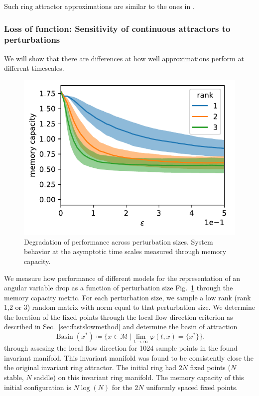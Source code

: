 \documentclass{article} %
\newcounter{ct}
\newcommand{\manifold}{\mathcal{M}}
\DeclareMathOperator{\basin}{Basin}
\theoremstyle{definition}
\theoremstyle{remark}
\begin{document}
 Such ring attractor approximations are similar to the ones in \citep{goodridge2000, samsonovich1997path, redish1996coupled, tsodyks1995associative}. %



\subsubsection{Loss of function: Sensitivity of continuous attractors to perturbations}\label{sec:supp:boa}

We will show that there are differences at how well approximations perform at different timescales.

\begin{figure}[tbhp]
  \centering
  \includegraphics[width=\textwidth]{performance2}
  \caption{Degradation of performance across perturbation sizes. System behavior at the asymptotic time scales measured through memory capacity. }\label{fig:performance}
\end{figure}


We measure how performance of different models for the representation of an angular variable drop as a function of perturbation size Fig.~\ref{fig:performance} through the memory capacity metric.
For each perturbation size, we sample a low rank (rank 1,2 or 3) random matrix with norm equal to that perturbation size.
We determine the location of the fixed points through the local flow direction criterion as described in Sec.~\ref{sec:fastslowmethod}
and determine the basin of attraction
\begin{equation}
\basin(x^*) \coloneqq \{x\in \manifold \ | \lim_{t\rightarrow\infty}\varphi(t,x)=\{x^*\}\}.
\end{equation}
through assesing the local flow direction for 1024 sample points in the found invariant manifold.
This invariant manifold was found to be consistently close the the original invariant ring attractor.
The initial ring had \(2N\) fixed points (\(N\) stable, \(N\) saddle) on this invariant ring manifold.
The memory capacity of this initial configuration is \(N\log(N)\) for the \(2N\) uniformly spaced fixed points.
\end{document}
